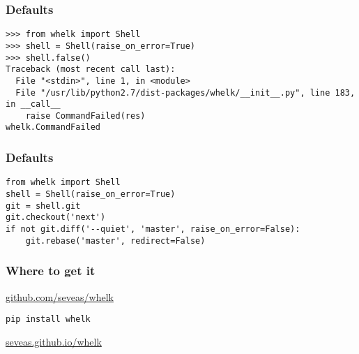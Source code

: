 \documentclass{beamer}
\begin{document}
\begin{frame}[fragile]
    \frametitle{Defaults}
    \begin{verbatim}
>>> from whelk import Shell
>>> shell = Shell(raise_on_error=True)
>>> shell.false()
Traceback (most recent call last):
  File "<stdin>", line 1, in <module>
  File "/usr/lib/python2.7/dist-packages/whelk/__init__.py", line 183, in __call__
    raise CommandFailed(res)
whelk.CommandFailed
    \end{verbatim}
\end{frame}

\begin{frame}[fragile]
    \frametitle{Defaults}
    \begin{verbatim}
from whelk import Shell
shell = Shell(raise_on_error=True)
git = shell.git
git.checkout('next')
if not git.diff('--quiet', 'master', raise_on_error=False):
    git.rebase('master', redirect=False)
    \end{verbatim}
\end{frame}

{
\begin{frame}
    \frametitle{Where to get it}
    \begin{description}[Documentation]
    \item[Source] \href{http://github.com/seveas/whelk/}{github.com/seveas/whelk}
    \item[PyPI] \texttt{pip install whelk}
    \item[Documentation] \href{http://seveas.github.io/whelk/}{seveas.github.io/whelk}
    \end{description}
\end{frame}
}
\end{document}
